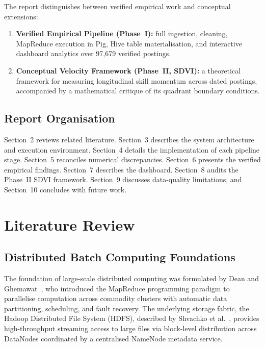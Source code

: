 \documentclass[10pt,a4paper]{article}
\begin{document}
The report distinguishes between verified empirical work and conceptual extensions:
\begin{enumerate}[label=(\alph*)]
  \item \textbf{Verified Empirical Pipeline (Phase~I):} full ingestion, cleaning, MapReduce execution in Pig, Hive table materialisation, and interactive dashboard analytics over 97,679 verified postings.
  \item \textbf{Conceptual Velocity Framework (Phase~II, SDVI):} a theoretical framework for measuring longitudinal skill momentum across dated postings, accompanied by a mathematical critique of its quadrant boundary conditions.
\end{enumerate}

\subsection{Report Organisation}
Section~2 reviews related literature. Section~3 describes the system architecture and execution environment. Section~4 details the implementation of each pipeline stage. Section~5 reconciles numerical discrepancies. Section~6 presents the verified empirical findings. Section~7 describes the dashboard. Section~8 audits the Phase~II SDVI framework. Section~9 discusses data-quality limitations, and Section~10 concludes with future work.

\section{Literature Review}

\subsection{Distributed Batch Computing Foundations}
The foundation of large-scale distributed computing was formulated by Dean and Ghemawat~\cite{dean2004mapreduce}, who introduced the MapReduce programming paradigm to parallelise computation across commodity clusters with automatic data partitioning, scheduling, and fault recovery. The underlying storage fabric, the Hadoop Distributed File System (HDFS), described by Shvachko et al.~\cite{shvachko2010hdfs}, provides high-throughput streaming access to large files via block-level distribution across DataNodes coordinated by a centralised NameNode metadata service.
\end{document}
